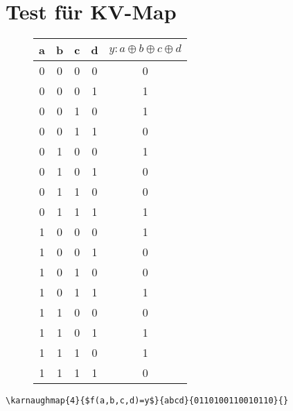 

\section{Test für KV-Map}

\begin{figure}[h!]
	\begin{table}
		\begin{tabular}{cccc|c}
   		a
    		& b
     		& c
      		& d
       		&$ y: a \mathbin{\oplus} b \oplus c \oplus d$ \\
       		\hline
       		0 & 0 & 0 & 0 & 0 \\
       		0 & 0 & 0 & 1 & 1 \\
       		0 & 0 & 1 & 0 & 1 \\
       		0 & 0 & 1 & 1 & 0 \\
       		0 & 1 & 0 & 0 & 1 \\
       		0 & 1 & 0 & 1 & 0 \\
       		0 & 1 & 1 & 0 & 0 \\
       		0 & 1 & 1 & 1 & 1 \\
       		1 & 0 & 0 & 0 & 1 \\
       		1 & 0 & 0 & 1 & 0 \\
       		1 & 0 & 1 & 0 & 0 \\
       		1 & 0 & 1 & 1 & 1 \\
       		1 & 1 & 0 & 0 & 0 \\
       		1 & 1 & 0 & 1 & 1 \\
       		1 & 1 & 1 & 0 & 1 \\
       		1 & 1 & 1 & 1 & 0 \\
       		\end{tabular}
	\end{table}

	\kvnoindex

	\begin{figure}
	\end{figure}
\end{figure}
\verb?\karnaughmap{4}{$f(a,b,c,d)=y$}{abcd}{0110100110010110}{}?

